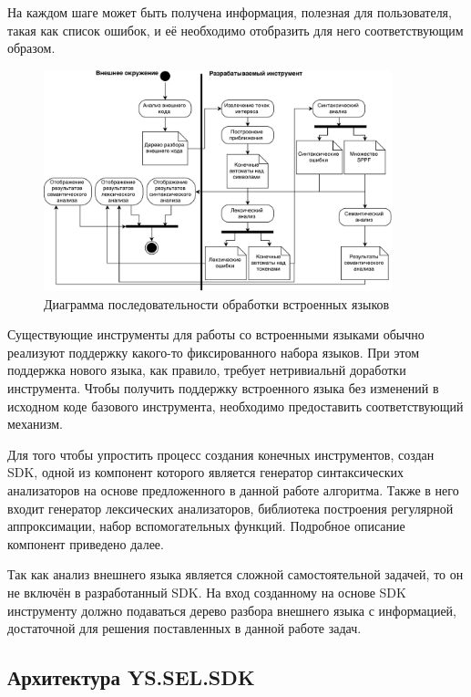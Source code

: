На каждом шаге может быть получена информация, полезная для пользователя, такая как список ошибок, и её необходимо отобразить для него соответствующим образом.

\begin{figure}[h!]
\begin{center}
\includegraphics[width=0.9\textwidth]{pics/Activ_SEL_Processing}
\caption{Диаграмма последовательности обработки встроенных языков}
\label{fig:SeqSelProcessing} 
\end{center}
\end{figure}


Существующие инструменты для работы со встроенными языками обычно реализуют поддержку какого-то фиксированного набора языков. При этом поддержка нового языка, как правило, требует нетривиальнй доработки инструмента. Чтобы получить поддержку встроенного языка без изменений в исходном коде базового инструмента, необходимо предоставить соответствующий механизм. 

Для того чтобы упростить процесс создания конечных инструментов, создан SDK, одной из компонент которого является генератор синтаксических анализаторов на основе предложенного в данной работе алгоритма. Также в него входит генератор лексических анализаторов, библиотека построения регулярной аппроксимации, набор вспомогательных функций. Подробное описание компонент приведено далее.

Так как анализ внешнего языка является сложной самостоятельной задачей, то он не включён в разработанный SDK. На вход созданному на основе SDK инструменту должно подаваться дерево разбора внешнего языка с информацией, достаточной для решения поставленных в данной работе задач. 


\subsection{Архитектура YS.SEL.SDK}

